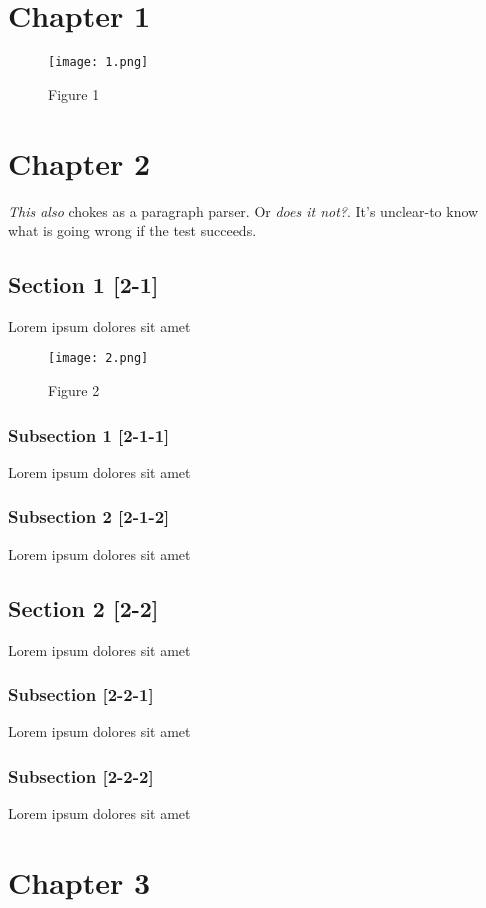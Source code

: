\chapter{Chapter 1}
\label{chap:included}

\begin{figure}
    \texttt{[image: 1.png]}
    \caption{Figure 1}
    \label{graphic:figure-1}
\end{figure}

\chapter{Chapter 2}
\label{chap:sibling}

\emph{This also} chokes as a paragraph parser. Or \emph{does it not?}. It's unclear-to know what is going wrong if the test succeeds.

\section{Section 1 [2-1]}
\label{sec:section}

Lorem ipsum dolores sit amet

\begin{figure}
    \texttt{[image: 2.png]}
    \caption{Figure 2}
    \label{graphic:figure-2}
\end{figure}

\subsection{Subsection 1 [2-1-1]}
\label{subsec:subsection}

Lorem ipsum dolores sit amet

\subsection{Subsection 2 [2-1-2]}
\label{subsec:sibling-subsection}

Lorem ipsum dolores sit amet

\section{Section 2 [2-2]}
\label{sec:another}

Lorem ipsum dolores sit amet

\subsection{Subsection [2-2-1]}
\label{subsec:another-2}

Lorem ipsum dolores sit amet

\subsection{Subsection [2-2-2]}
\label{subsec:another-3}

Lorem ipsum dolores sit amet

\chapter{Chapter 3}
\label{chap:othersibling}